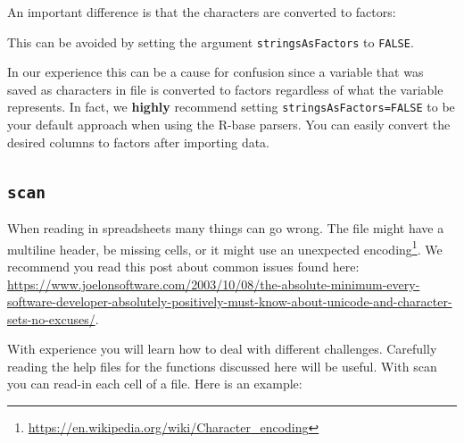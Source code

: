 \documentclass[
]{krantz}
\newenvironment{Shaded}{\begin{snugshade}}{\end{snugshade}}
\newcommand{\CommentTok}[1]{\textcolor[rgb]{0.37,0.37,0.37}{\textit{#1}}}
\newcommand{\DataTypeTok}[1]{\textcolor[rgb]{0.27,0.27,0.27}{#1}}
\newcommand{\KeywordTok}[1]{\textcolor[rgb]{0.27,0.27,0.27}{\textbf{#1}}}
\newcommand{\NormalTok}[1]{#1}
\newcommand{\OperatorTok}[1]{\textcolor[rgb]{0.43,0.43,0.43}{\textbf{#1}}}
\newcommand{\OtherTok}[1]{\textcolor[rgb]{0.37,0.37,0.37}{#1}}
\newcommand{\StringTok}[1]{\textcolor[rgb]{0.5,0.5,0.5}{#1}}
\begin{document}
An important difference is that the characters are converted to factors:

\begin{Shaded}
\end{Shaded}

This can be avoided by setting the argument \texttt{stringsAsFactors} to \texttt{FALSE}.

\begin{Shaded}
\end{Shaded}

In our experience this can be a cause for confusion since a variable that was saved as characters in file is converted to factors regardless of what the variable represents. In fact, we \textbf{highly} recommend setting \texttt{stringsAsFactors=FALSE} to be your default approach when using the R-base parsers. You can easily convert the desired columns to factors after importing data.

\hypertarget{scan}{%
\subsection{\texorpdfstring{\texttt{scan}}{scan}}\label{scan}}

When reading in spreadsheets many things can go wrong. The file might have a multiline header, be missing cells, or it might use an unexpected encoding\footnote{\url{https://en.wikipedia.org/wiki/Character_encoding}}. We recommend you read this post about common issues found here: \url{https://www.joelonsoftware.com/2003/10/08/the-absolute-minimum-every-software-developer-absolutely-positively-must-know-about-unicode-and-character-sets-no-excuses/}.

With experience you will learn how to deal with different challenges. Carefully reading the help files for the functions discussed here will be useful. With scan you can read-in each cell of a file. Here is an example:
\end{document}
